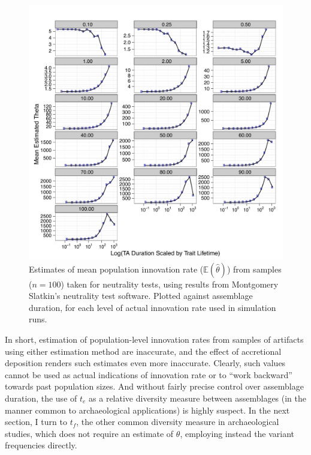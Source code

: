 \begin{figure}
	\includegraphics[scale=0.85]{graphics/timeaveraging/theta-estimates-scaled-Slatkin-theta-01-100.pdf}
	\caption{Estimates of mean population innovation rate ($\mathbb{E}(\hat{\theta})$) from samples ($n = 100$) taken for neutrality tests, using results from Montgomery Slatkin's neutrality test software.  Plotted against assemblage duration, for each level of actual innovation rate used in simulation runs. }
	\label{fig:theta-estimates-slatkin}
\end{figure}

In short, estimation of population-level innovation rates from samples of artifacts using either estimation method are inaccurate, and the \timeav effect of accretional deposition renders such estimates even more inaccurate.  Clearly, such values cannot be used as actual indications of innovation rate or to ``work backward'' towards past population sizes.  And without fairly precise control over assemblage duration, the use of $t_e$ as a relative diversity measure between assemblages (in the manner common to archaeological applications) is highly suspect.  In the next section, I turn to $t_f$, the other common diversity measure in archaeological studies, which does not require an estimate of $\theta$, employing instead the variant frequencies directly.    

